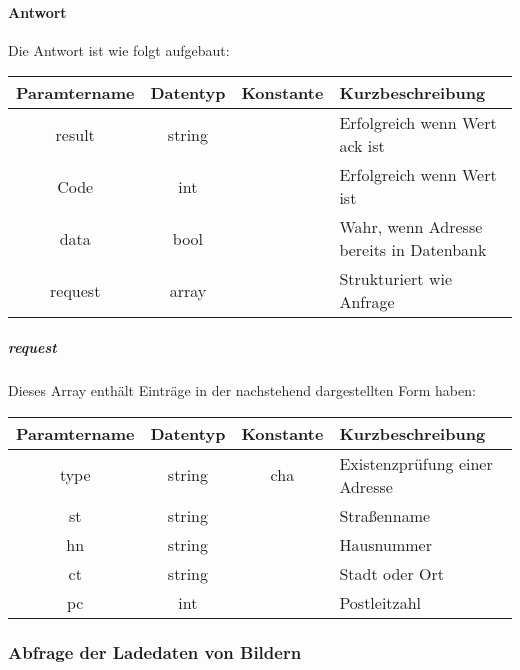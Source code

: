 \paragraph{Antwort}Die Antwort ist wie folgt aufgebaut:
\begin{table}[H]
	\begin{tabular}{|c|c|c|p{6.5cm}|}
		\hline
		\textbf{Paramtername} & \textbf{Datentyp} & \textbf{Konstante} & \textbf{Kurzbeschreibung}                                                                                               \\ \hline
		result              & string           &                 & Erfolgreich wenn Wert {\glqq ack\grqq} ist \\ \hline
		Code                & int              &                 & Erfolgreich wenn Wert {\glqq 0\grqq} ist \\ \hline
		data                & bool             &                 & Wahr, wenn Adresse bereits in Datenbank \\ \hline
		request             & array            &                 & Strukturiert wie Anfrage \\ \hline
	\end{tabular}
\end{table}
\subparagraph{request}Dieses Array enthält Einträge in der nachstehend dargestellten Form haben:
\begin{table}[H]
	\begin{tabular}{|c|c|c|p{6.5cm}|}
		\hline
		\textbf{Paramtername} & \textbf{Datentyp} & \textbf{Konstante} & \textbf{Kurzbeschreibung}    \\ \hline
		type                   & string          & cha             & Existenzprüfung einer Adresse \\ \hline
		st                     & string          &                 & Straßenname \\ \hline
		hn                     & string          &                 & Hausnummer \\ \hline
		ct                     & string          &                 & Stadt oder Ort \\ \hline
		pc                     & int             &                 & Postleitzahl \\ \hline
	\end{tabular}
\end{table}
\subsubsection{Abfrage der Ladedaten von Bildern}
